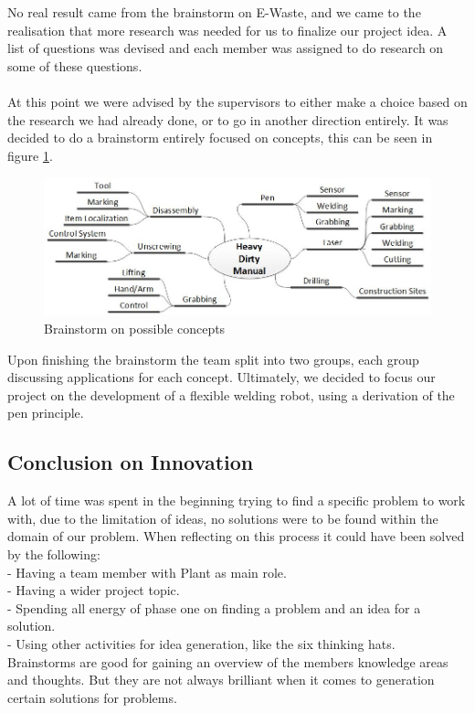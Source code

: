 No real result came from the brainstorm on E-Waste, and we came to the realisation that more research was needed for us to finalize our project idea. A list of questions was devised and each member was assigned to do research on some of these questions. \\~~\\
At this point we were advised by the supervisors to either make a choice based on the research we had already done, or to go in another direction entirely. It was decided to do a brainstorm entirely focused on concepts, this can be seen in figure \ref{fig:conceptsBrainstorm}.

\begin{figure}[!ht]
	\centering
	\includegraphics[scale=.5]{./graphics/conceptsBrainstorm.jpg}
	\caption{Brainstorm on possible concepts}
	\label{fig:conceptsBrainstorm}
\end{figure}

Upon finishing the brainstorm the team split into two groups, each group discussing applications for each concept. Ultimately, we decided to focus our project on the development of a flexible welding robot, using a derivation of the pen principle.

\subsection{Conclusion on Innovation}
A lot of time was spent in the beginning trying to find a specific problem to work with, due to the limitation of ideas, no solutions were to be found within the domain of our problem. When reflecting on this process it could have been solved by the following: \\
- Having a team member with Plant as main role. \\
- Having a wider project topic. \\
- Spending all energy of phase one on finding a problem and an idea for a solution. \\
- Using other activities for idea generation, like the six thinking hats. \\
Brainstorms are good for gaining an overview of the members knowledge areas and thoughts. But they are not always brilliant when it comes to generation certain solutions for problems. 